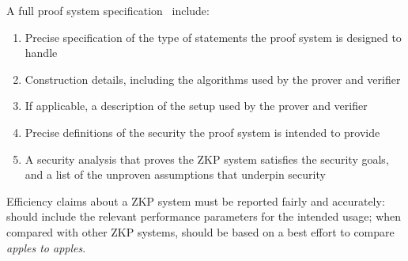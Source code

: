 A full proof system specification \shall\ include:

\begin{enumerate}
\item Precise specification of the type of statements the proof system is designed to handle
\item Construction details, including the algorithms used by the prover and verifier
\item If applicable, a description of the setup used by the prover and verifier
\item Precise definitions of the security the proof system is intended to provide
\item A security analysis that proves the ZKP system satisfies the security goals, and a list of the unproven assumptions that underpin security
\end{enumerate}

Efficiency claims about a ZKP system must be reported fairly and accurately:
should include the relevant performance parameters for the intended usage;
when compared with other ZKP systems, should be based on a best effort to compare \emph{apples to apples}.
